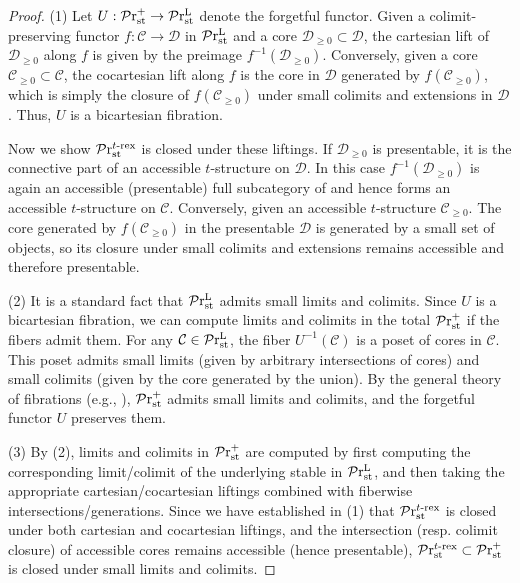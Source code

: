 \documentclass[a4paper,10pt, oneside]{amsart}
\begin{document}
	\begin{proof}
		(1) Let $U: \mathcal{P}\mathrm{r}^{+}_{\mathrm{st}} \to \mathcal{P}\mathrm{r}_{\mathrm{st}}^\mathrm{L}$ denote the forgetful functor. Given a colimit-preserving functor $f: \mathcal{C} \to \mathcal{D}$ in $\mathcal{P}\mathrm{r}_{\mathrm{st}}^\mathrm{L}$ and a core $\mathcal{D}_{\geq 0} \subset \mathcal{D}$, the cartesian lift of $\mathcal{D}_{\geq 0}$ along $f$ is given by the preimage $f^{-1}(\mathcal{D}_{\geq 0})$.  Conversely, given a core $\mathcal{C}_{\geq 0} \subset \mathcal{C}$, the cocartesian lift along $f$ is the core in $\mathcal{D}$ generated by $f(\mathcal{C}_{\geq 0})$, which is simply the closure of $f(\mathcal{C}_{\geq 0})$ under small colimits and extensions in $\mathcal{D}$. Thus, $U$ is a bicartesian fibration.
		
		Now we show $\mathcal{P}\mathrm{r}^{t\text{-rex}}_{\mathrm{st}}$ is closed under these liftings. If $\mathcal{D}_{\geq 0}$ 
		is presentable, it is the connective part of an accessible $t$-structure on 
		$\mathcal{D}$. In this case $f^{-1}(\mathcal{D}_{\geq 0})$ is again an accessible 
		(presentable) full subcategory of \mcc and hence forms an accessible $t$-structure 
		on $\mathcal{C}$. Conversely, given an accessible $t$-structure 
		$\mathcal{C}_{\geq 0}$. The core generated by $f(\mathcal{C}_{\geq 0})$ in the 
		presentable \infcat $\mathcal{D}$ is generated by a small set of objects, so its 
		closure under small colimits and extensions remains accessible and therefore 
		presentable. 
		
		(2) It is a standard fact that $\mathcal{P}\mathrm{r}_{\mathrm{st}}^\mathrm{L}$ admits small limits and colimits. Since $U$ is a bicartesian fibration, we can compute limits and colimits in the total \infcat $\mathcal{P}\mathrm{r}^{+}_{\mathrm{st}}$ if the fibers admit them. For any $\mathcal{C} \in \mathcal{P}\mathrm{r}_{\mathrm{st}}^\mathrm{L}$, the fiber $U^{-1}(\mathcal{C})$ is a poset of cores in $\mathcal{C}$. This poset admits small limits (given by arbitrary intersections of cores) and small colimits (given by the core generated by the union). By the general theory of fibrations (e.g., \cite[Proposition 4.3.1.10]{htt}), $\mathcal{P}\mathrm{r}^{+}_{\mathrm{st}}$ admits small limits and colimits, and the forgetful functor $U$  preserves them.
		
		(3) By (2), limits and colimits in $\mathcal{P}\mathrm{r}^{+}_{\mathrm{st}}$ are computed by first computing the corresponding limit/colimit of the underlying stable \infcats in $\mathcal{P}\mathrm{r}_{\mathrm{st}}^\mathrm{L}$, and then taking the appropriate cartesian/cocartesian liftings combined with fiberwise intersections/generations. Since we have established in (1) that $\mathcal{P}\mathrm{r}^{t\text{-rex}}_{\mathrm{st}}$ is closed under both cartesian and cocartesian liftings, and the intersection (resp. colimit closure) of accessible cores remains accessible (hence presentable), $\mathcal{P}\mathrm{r}^{t\text{-rex}}_{\mathrm{st}} \subset \mathcal{P}\mathrm{r}^{+}_{\mathrm{st}}$ is closed under small limits and colimits.
	\end{proof}
\end{document}
